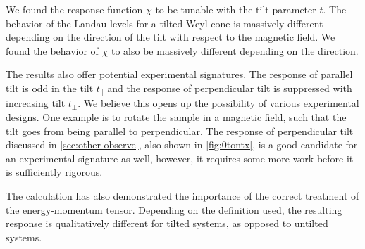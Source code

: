 We found the response function \( \chi \) to be tunable with the tilt parameter \( t \).
The behavior of the Landau levels for a tilted Weyl cone is massively different depending on the direction of the tilt with respect to the magnetic field.
We found the behavior of \( \chi \) to also be massively different depending on the direction.

The results also offer potential experimental signatures.
The response of parallel tilt is odd in the tilt \( t_\parallel \) and the response of perpendicular tilt is suppressed with increasing tilt \( t_\perp \).
We believe this opens up the possibility of various experimental designs.
One example is to rotate the sample in a magnetic field, such that the tilt goes from being parallel to perpendicular.
The response of perpendicular tilt discussed in \cref{sec:other-observe}, also shown in \cref{fig:0tontx}, is a good candidate for an experimental signature as well, however, it requires some more work before it is sufficiently rigorous.


The calculation has also demonstrated the importance of the correct treatment of the energy-momentum tensor.
Depending on the definition used, the resulting response is qualitatively different for tilted systems, as opposed to untilted systems.

